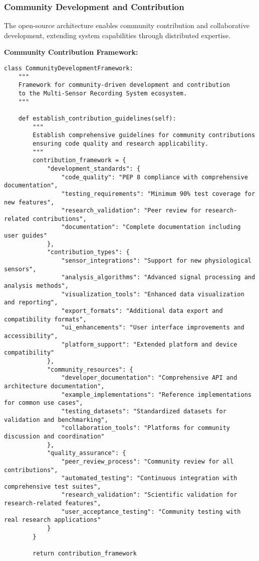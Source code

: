 \documentclass[12pt,a4paper]{article}
\begin{document}
\subsubsection{Community Development and Contribution}

The open-source architecture enables community contribution and collaborative development, extending system capabilities
through distributed expertise.

\textbf{Community Contribution Framework:}

\begin{verbatim}
class CommunityDevelopmentFramework:
    """
    Framework for community-driven development and contribution
    to the Multi-Sensor Recording System ecosystem.
    """
    
    def establish_contribution_guidelines(self):
        """
        Establish comprehensive guidelines for community contributions
        ensuring code quality and research applicability.
        """
        contribution_framework = {
            "development_standards": {
                "code_quality": "PEP 8 compliance with comprehensive documentation",
                "testing_requirements": "Minimum 90% test coverage for new features",
                "research_validation": "Peer review for research-related contributions",
                "documentation": "Complete documentation including user guides"
            },
            "contribution_types": {
                "sensor_integrations": "Support for new physiological sensors",
                "analysis_algorithms": "Advanced signal processing and analysis methods",
                "visualization_tools": "Enhanced data visualization and reporting",
                "export_formats": "Additional data export and compatibility formats",
                "ui_enhancements": "User interface improvements and accessibility",
                "platform_support": "Extended platform and device compatibility"
            },
            "community_resources": {
                "developer_documentation": "Comprehensive API and architecture documentation",
                "example_implementations": "Reference implementations for common use cases",
                "testing_datasets": "Standardized datasets for validation and benchmarking",
                "collaboration_tools": "Platforms for community discussion and coordination"
            },
            "quality_assurance": {
                "peer_review_process": "Community review for all contributions",
                "automated_testing": "Continuous integration with comprehensive test suites",
                "research_validation": "Scientific validation for research-related features",
                "user_acceptance_testing": "Community testing with real research applications"
            }
        }
        
        return contribution_framework
\end{verbatim}
\end{document}
